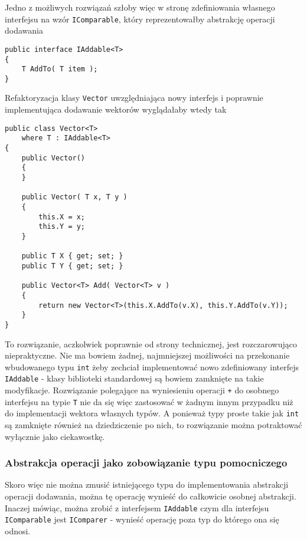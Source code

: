 Jedno z możliwych rozwiązań szłoby więc w stronę zdefiniowania własnego interfejsu na wzór {\tt IComparable}, który
reprezentowałby abstrakcję operacji dodawania

\begin{scriptsize}
\begin{verbatim}
public interface IAddable<T>
{
    T AddTo( T item );
}
\end{verbatim}
\end{scriptsize}

Refaktoryzacja klasy {\tt Vector} uwzględniająca nowy interfejs i poprawnie implementująca dodawanie wektorów
wyglądałaby wtedy tak

\begin{scriptsize}
\begin{verbatim}
public class Vector<T>
    where T : IAddable<T>
{
    public Vector()
    {
    }

    public Vector( T x, T y )
    {
        this.X = x;
        this.Y = y;
    }

    public T X { get; set; }
    public T Y { get; set; }

    public Vector<T> Add( Vector<T> v )
    {
        return new Vector<T>(this.X.AddTo(v.X), this.Y.AddTo(v.Y));
    }
}
\end{verbatim}
\end{scriptsize}

To rozwiązanie, aczkolwiek poprawnie od strony technicznej, jest rozczarowująco niepraktyczne. Nie ma bowiem
żadnej, najmniejszej możliwości na przekonanie wbudowanego typu {\tt int} żeby zechciał implementować
nowo zdefiniowany interfejs {\tt IAddable} - klasy biblioteki standardowej są bowiem zamknięte na takie modyfikacje.
Rozwiązanie polegające na wyniesieniu operacji {\tt +} do osobnego interfejsu na typie {\tt T} nie da się więc
zastosować w żadnym innym przypadku niż do implementacji wektora własnych typów. A ponieważ typy proste takie jak
{\tt int} są zamknięte również na dziedziczenie po nich, to rozwiązanie można potraktować wyłącznie jako ciekawostkę.

\subsubsection{Abstrakcja operacji jako zobowiązanie typu pomocniczego}

Skoro więc nie można zmusić istniejącego typu do implementowania abstrakcji operacji dodawania, można tę operację
wynieść do całkowicie osobnej abstrakcji. Inaczej mówiąc, można zrobić z interfejsem {\tt IAddable} czym dla interfejsu
{\tt IComparable} jest {\tt IComparer} - wynieść operację poza typ do którego ona się odnosi.

